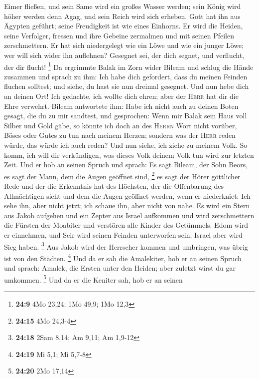 Eimer fließen, und sein Same wird ein großes Wasser werden; sein König
wird höher werden denn Agag, und sein Reich wird sich erheben.
 Gott hat ihn aus Ägypten geführt; seine Freudigkeit ist
wie eines Einhorns. Er wird die Heiden, seine Verfolger, fressen und
ihre Gebeine zermalmen und mit seinen Pfeilen zerschmettern.
 Er hat sich niedergelegt wie ein Löwe und wie ein junger
Löwe; wer will sich wider ihn auflehnen? Gesegnet sei, der dich segnet,
und verflucht, der dir flucht! \footnote{\textbf{24:9} 4Mo 23,24; 1Mo
  49,9; 1Mo 12,3}  Da ergrimmte Balak im Zorn wider
Bileam und schlug die Hände zusammen und sprach zu ihm: Ich habe dich
gefordert, dass du meinen Feinden fluchen solltest; und siehe, du hast
sie nun dreimal gesegnet.  Und nun hebe dich an deinen
Ort! Ich gedachte, ich wollte dich ehren; aber der \textsc{Herr} hat dir
die Ehre verwehrt.  Bileam antwortete ihm: Habe ich nicht
auch zu deinen Boten gesagt, die du zu mir sandtest, und gesprochen:
 Wenn mir Balak sein Haus voll Silber und Gold gäbe, so
könnte ich doch an des \textsc{Herrn} Wort nicht vorüber, Böses oder
Gutes zu tun nach meinem Herzen; sondern was der \textsc{Herr} reden
würde, das würde ich auch reden?  Und nun siehe, ich
ziehe zu meinem Volk. So komm, ich will dir verkündigen, was dieses Volk
deinem Volk tun wird zur letzten Zeit.  Und er hob an
seinen Spruch und sprach: Es sagt Bileam, der Sohn Beors, es sagt der
Mann, dem die Augen geöffnet sind, \footnote{\textbf{24:15} 4Mo 24,3-4}
 es sagt der Hörer göttlicher Rede und der die Erkenntnis
hat des Höchsten, der die Offenbarung des Allmächtigen sieht und dem die
Augen geöffnet werden, wenn er niederkniet:  Ich sehe
ihn, aber nicht jetzt; ich schaue ihn, aber nicht von nahe. Es wird ein
Stern aus Jakob aufgehen und ein Zepter aus Israel aufkommen und wird
zerschmettern die Fürsten der Moabiter und verstören alle Kinder des
Getümmels.  Edom wird er einnehmen, und Seir wird seinen
Feinden unterworfen sein; Israel aber wird Sieg haben. \footnote{\textbf{24:18}
  2Sam 8,14; Am 9,11; Am 1,9-12}  Aus Jakob wird der
Herrscher kommen und umbringen, was übrig ist von den Städten.
\footnote{\textbf{24:19} Mi 5,1; Mi 5,7-8}  Und da er sah
die Amalekiter, hob er an seinen Spruch und sprach: Amalek, die Ersten
unter den Heiden; aber zuletzt wirst du gar umkommen. \footnote{\textbf{24:20}
  2Mo 17,14}  Und da er die Keniter sah, hob er an seinen
